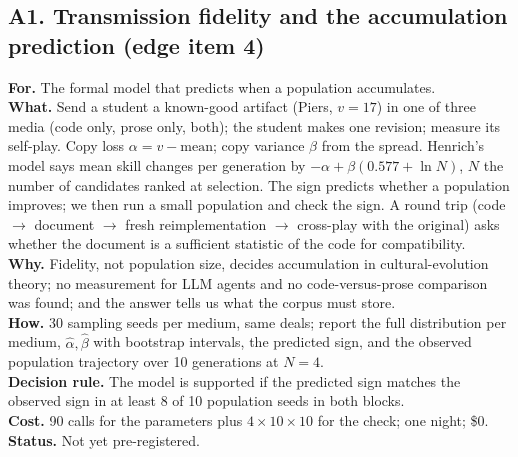 \documentclass[11pt]{article}
\begin{document}
\subsection{A1. Transmission fidelity and the accumulation prediction (edge item 4)}
\textbf{For.} The formal model that predicts when a population accumulates.\\
\textbf{What.} Send a student a known-good artifact (Piers, $v=17$) in one of three media (code only, prose only,
both); the student makes one revision; measure its self-play. Copy loss $\alpha=v-\text{mean}$; copy variance
$\beta$ from the spread. Henrich's model says mean skill changes per generation by $-\alpha+\beta(0.577+\ln N)$,
$N$ the number of candidates ranked at selection. The sign predicts whether a population improves; we then run a
small population and check the sign. A round trip (code $\to$ document $\to$ fresh reimplementation $\to$
cross-play with the original) asks whether the document is a sufficient statistic of the code for compatibility.\\
\textbf{Why.} Fidelity, not population size, decides accumulation in cultural-evolution theory; no measurement for
LLM agents and no code-versus-prose comparison was found; and the answer tells us what the corpus must store.\\
\textbf{How.} 30 sampling seeds per medium, same deals; report the full distribution per medium, $\hat\alpha,
\hat\beta$ with bootstrap intervals, the predicted sign, and the observed population trajectory over 10 generations
at $N=4$.\\
\textbf{Decision rule.} The model is supported if the predicted sign matches the observed sign in at least 8 of 10
population seeds in both blocks.\\
\textbf{Cost.} 90 calls for the parameters plus $4\times10\times10$ for the check; one night; \$0.\\
\textbf{Status.} Not yet pre-registered.
\end{document}
